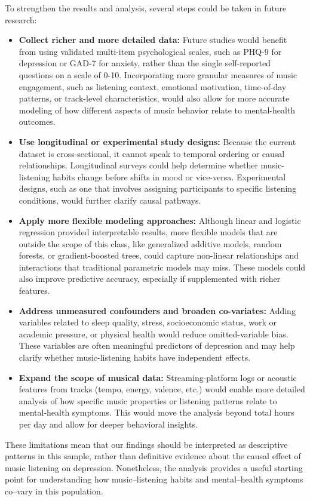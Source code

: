 \documentclass[
  letterpaper,
  DIV=11,
  numbers=noendperiod]{scrartcl}
\providecommand{\tightlist}{%
  \setlength{\itemsep}{0pt}\setlength{\parskip}{0pt}}\usepackage{longtable,booktabs,array}
\begin{document}
To strengthen the results and analysis, several steps could be taken in
future research:

\begin{itemize}
\tightlist
\item
  \textbf{Collect richer and more detailed data:} Future studies would
  benefit from using validated multi-item psychological scales, such as
  PHQ-9 for depression or GAD-7 for anxiety, rather than the single
  self-reported questions on a scale of 0-10. Incorporating more
  granular measures of music engagement, such as listening context,
  emotional motivation, time-of-day patterns, or track-level
  characteristics, would also allow for more accurate modeling of how
  different aspects of music behavior relate to mental-health outcomes.
\item
  \textbf{Use longitudinal or experimental study designs:} Because the
  current dataset is cross-sectional, it cannot speak to temporal
  ordering or causal relationships. Longitudinal surveys could help
  determine whether music-listening habits change before shifts in mood
  or vice-versa. Experimental designs, such as one that involves
  assigning participants to specific listening conditions, would further
  clarify causal pathways.
\item
  \textbf{Apply more flexible modeling approaches:} Although linear and
  logistic regression provided interpretable results, more flexible
  models that are outside the scope of this class, like generalized
  additive models, random forests, or gradient-boosted trees, could
  capture non-linear relationships and interactions that traditional
  parametric models may miss. These models could also improve predictive
  accuracy, especially if supplemented with richer features.
\item
  \textbf{Address unmeasured confounders and broaden co-variates:}
  Adding variables related to sleep quality, stress, socioeconomic
  status, work or academic pressure, or physical health would reduce
  omitted-variable bias. These variables are often meaningful predictors
  of depression and may help clarify whether music-listening habits have
  independent effects.
\item
  \textbf{Expand the scope of musical data:} Streaming-platform logs or
  acoustic features from tracks (tempo, energy, valence, etc.) would
  enable more detailed analysis of how specific music properties or
  listening patterns relate to mental-health symptoms. This would move
  the analysis beyond total hours per day and allow for deeper
  behavioral insights.
\end{itemize}

These limitations mean that our findings should be interpreted as
descriptive patterns in this sample, rather than definitive evidence
about the causal effect of music listening on depression. Nonetheless,
the analysis provides a useful starting point for understanding how
music--listening habits and mental--health symptoms co--vary in this
population.
\end{document}
